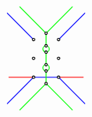 \[\begin{tikzcd}[row sep=-3pc]
\begin{tikzpicture}[baseline=-.5ex, scale=0.4]
\begin{scope}[yshift=-1.5cm]
\draw[red, thick] (-3,0) -- (-1,0) (1,0) -- (3,0);
\draw[blue, thick] (-1,0) --(1,0);
\end{scope}
\draw[blue, thick] (-1,1.5) -- +(135:3) (-1,-1.5) -- +(-135:3) (1,1.5) -- +(45:3) (1,-1.5) -- +(-45:3);
\draw[green, thick] (0,2) -- +(135:3) ++(0,0) -- +(45:3) (0,-2) -- +(-135:3) ++(0,0) -- +(-45:3) (0,2) -- (0,1) (0,0.5) -- (0,-0.5) (0,-1) -- (0,-2) (0, 0.75) circle (0.25) (0, -0.75) circle (0.25);
\draw[thick, fill=white] (-1,0) circle (0.1) (-1,1.5) circle (0.1) (-1,-1.5) circle (0.1) (0,2) circle (0.1) (1,0) circle (0.1) (1,1.5) circle (0.1) (1,-1.5) circle (0.1) (0,-2) circle (0.1) (0,0.5) circle (0.1) (0,1) circle (0.1) (0,-0.5) circle (0.1) (0,-1) circle (0.1);
\end{tikzpicture}
\end{tikzcd}
\]

